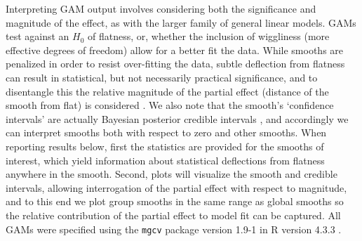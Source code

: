 \documentclass[]{imag-ms-template}
\begin{document}
Interpreting GAM output involves considering both the significance and magnitude of the effect, as with the larger family of general linear models. GAMs test against an $H_0$ of flatness, or, whether the inclusion of wiggliness (more effective degrees of freedom) allow for a better fit the data. While smooths are penalized in order to resist over-fitting the data, subtle deflection from flatness can result in statistical, but not necessarily practical significance, and to disentangle this the relative magnitude of the partial effect (distance of the smooth from flat) is considered \parencite{baayen2020IntroductionGeneralizedAdditive}. We also note that the smooth's `confidence intervals' are actually Bayesian posterior credible intervals \parencite{pedersen2019HierarchicalGeneralizedAdditive}, and accordingly we can interpret smooths both with respect to zero and other smooths. When reporting results below, first the statistics are provided for the smooths of interest, which yield information about statistical deflections from flatness anywhere in the smooth. Second, plots will visualize the smooth and credible intervals, allowing interrogation of the partial effect with respect to magnitude, and to this end we plot group smooths in the same range as global smooths so the relative contribution of the partial effect to model fit can be captured. All GAMs were specified using the \lstinline{mgcv} package version 1.9-1 \parencite{wood2017GeneralizedAdditiveModels} in R version 4.3.3 \parencite{rcoreteam2023LanguageEnvironmentStatistical}.
\end{document}
